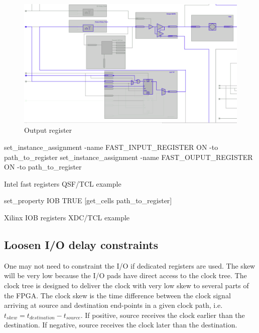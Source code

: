 \begin{figure}[htb]
    \centering
    \includegraphics[width=0.8\linewidth]{images/quartus/fastoutputregister-quartus}
    \caption{Output register}
    \label{fig:fastoutputregister-quartus}
\end{figure} 


\begin{listing}[ht]
\begin{tclcode*}{}
set_instance_assignment -name FAST_INPUT_REGISTER ON -to path_to_register
set_instance_assignment -name FAST_OUPUT_REGISTER ON -to path_to_register
\end{tclcode*}
\caption{Intel fast registers QSF/TCL example}
\label{listing:fastregister}
\end{listing}

\begin{listing}[ht]
\begin{tclcode*}{}
set_property IOB TRUE [get_cells {path_to_register}]
\end{tclcode*}
\caption{Xilinx IOB registers XDC/TCL example}
\label{listing:iobregister}
\end{listing}

\subsection{Loosen I/O delay constraints}

One may not need to constraint the I/O if dedicated registers are used. The skew will be very low because the I/O pads have direct access to the clock tree. The clock tree is designed to deliver the clock with very low skew to several parts of the FPGA. The clock skew is the time difference between the clock signal arriving at source and destination end-points in a given clock path, i.e. $t_{skew} = t_{destination} - t_{source}$. If positive, source receives the clock earlier than the destination. If negative, source receives the clock later than the destination. 

